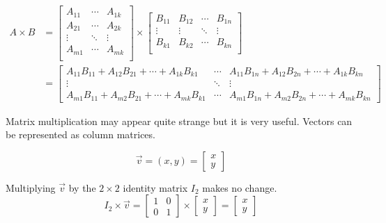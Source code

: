 \documentclass{book}
\begin{document}
\begin{equation}
\begin{split}
A \times B
&
=
\begin{bmatrix}
A_{11} & \cdots & A_{1k} \\
A_{21} & \cdots & A_{2k} \\
\vdots & \ddots & \vdots \\
A_{m1} & \cdots & A_{mk} \\
\end{bmatrix} \times
\begin{bmatrix}
B_{11} & B_{12} & \cdots & B_{1n} \\
\vdots & \vdots & \ddots & \vdots \\
B_{k1} & B_{k2} & \cdots & B_{kn} \\
\end{bmatrix} \\
&
=
\begin{bmatrix}
A_{11} B_{11} + A_{12}B_{21} + \cdots + A_{1k}B_{k1} & 
\cdots &
A_{11} B_{1n} + A_{12}B_{2n} + \cdots + A_{1k}B_{kn} \\
\vdots & \ddots & \vdots \\
A_{m1} B_{11} + A_{m2}B_{21} + \cdots + A_{mk}B_{k1} & 
\cdots &
A_{m1} B_{1n} + A_{m2}B_{2n} + \cdots + A_{mk}B_{kn}
\end{bmatrix}
\end{split}
\end{equation}

Matrix multiplication may appear quite strange but it is very useful. Vectors can be represented as column matrices.

\begin{equation*}
\vec{v} = (x,y) = \begin{bmatrix}x \\ y\end{bmatrix}
\end{equation*}

Multiplying $\vec{v}$ by the $2 \times 2$ identity matrix $I_2$ makes no change.
\begin{equation*}I_2 \times \vec{v} =
\begin{bmatrix}1 & 0 \\ 0 & 1\end{bmatrix} \times 
\begin{bmatrix}x \\ y\end{bmatrix} = \begin{bmatrix}x \\ y\end{bmatrix}
\end{equation*}
\end{document}
